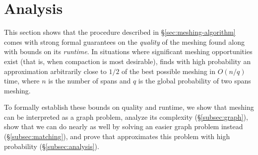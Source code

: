 \section{Analysis}
\label{sec:theory}


\newenvironment{claimproof}[1]{\par\noindent\underline{Proof:}\space#1}{\hfill $\blacksquare$}





\newcommand{\bigo}{\mathcal{O}}
\newcommand{\page}{\pi}
\newcommand{\str}{s}
\newcommand{\node}{\mathit {v}}
\newcommand{\W}{\mathcal {W}}
\newcommand{\lp}{\left(}
\newcommand{\rparen}{\right)}

This section shows that the \sm procedure described in
\S\ref{sec:meshing-algorithm} comes with strong formal guarantees on
the \textit{quality} of the meshing found along with bounds on its
\textit{runtime}.  In situations where significant meshing
opportunities exist (that is, when compaction is most desirable), \sm
finds with high probability an approximation arbitrarily close to
$1/2$ of the best possible meshing in $O\lp n/q\rparen$ time, where
$n$ is the number of spans and $q$ is the global probability of two
spans meshing.

To formally establish these bounds on quality and runtime, we show
that meshing can be interpreted as a graph problem, analyze its
complexity (\S\ref{subsec:graph}), show that we can do nearly as well
by solving an easier graph problem instead (\S\ref{subsec:matching}),
and prove that \sm approximates this problem with high probability
(\S\ref{subsec:analysis}).


